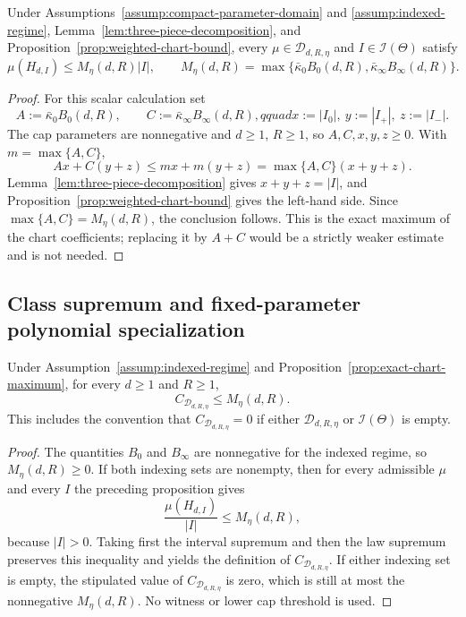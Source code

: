 \begin{proposition}
\label{prop:exact-chart-maximum}
Under Assumptions~\ref{assump:compact-parameter-domain} and
\ref{assump:indexed-regime}, Lemma~\ref{lem:three-piece-decomposition}, and
Proposition~\ref{prop:weighted-chart-bound}, every
$\mu\in\mathcal D_{d,R,\eta}$ and $I\in\mathcal I(\Theta)$ satisfy
\[
\mu(H_{d,I})\leq M_\eta(d,R)|I|,
\qquad
M_\eta(d,R)=\max\{\bar\kappa_0B_0(d,R),
\bar\kappa_\infty B_\infty(d,R)\}.
\]
\end{proposition}

\begin{proof}
For this scalar calculation set
\[
A:=\bar\kappa_0B_0(d,R),\qquad
C:=\bar\kappa_\infty B_\infty(d,R),qquad
x:=|I_0|,\ y:=|I_+|,\ z:=|I_-|.
\]
The cap parameters are nonnegative and $d\geq1$, $R\geq1$, so
$A,C,x,y,z\geq0$.  With $m=\max\{A,C\}$,
\[
Ax+C(y+z)\leq mx+m(y+z)=\max\{A,C\}(x+y+z).
\]
Lemma~\ref{lem:three-piece-decomposition} gives
$x+y+z=|I|$, and Proposition~\ref{prop:weighted-chart-bound} gives the
left-hand side.  Since $\max\{A,C\}=M_\eta(d,R)$, the conclusion follows.
This is the exact maximum of the chart coefficients; replacing it by $A+C$
would be a strictly weaker estimate and is not needed.
\end{proof}

\subsection{Class supremum and fixed-parameter polynomial specialization}
\label{app:class-and-rate}

\begin{proposition}
\label{prop:class-supremum}
Under Assumption~\ref{assump:indexed-regime} and
Proposition~\ref{prop:exact-chart-maximum}, for every $d\geq1$ and $R\geq1$,
\[
C_{\mathcal D_{d,R,\eta}}\leq M_\eta(d,R).
\]
This includes the convention that $C_{\mathcal D_{d,R,\eta}}=0$ if either
$\mathcal D_{d,R,\eta}$ or $\mathcal I(\Theta)$ is empty.
\end{proposition}

\begin{proof}
The quantities $B_0$ and $B_\infty$ are nonnegative for the indexed regime,
so $M_\eta(d,R)\geq0$.  If both indexing sets are nonempty, then for every
admissible $\mu$ and every $I$ the preceding proposition gives
\[
\frac{\mu(H_{d,I})}{|I|}\leq M_\eta(d,R),
\]
because $|I|>0$.  Taking first the interval supremum and then the law
supremum preserves this inequality and yields the definition of
$C_{\mathcal D_{d,R,\eta}}$.  If either indexing set is empty, the stipulated
value of $C_{\mathcal D_{d,R,\eta}}$ is zero, which is still at most the
nonnegative $M_\eta(d,R)$.  No witness or lower cap threshold is used.
\end{proof}

